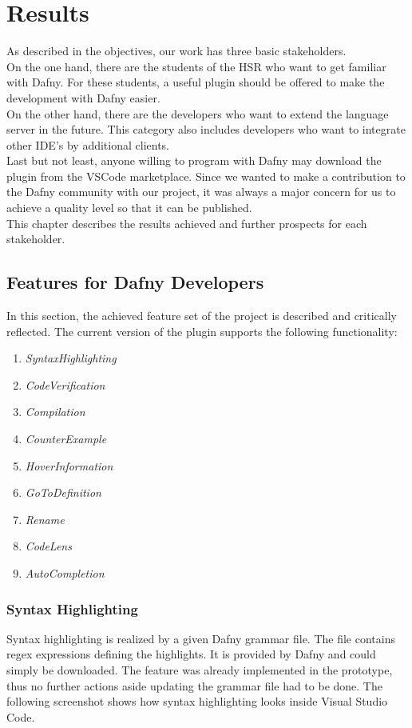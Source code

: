 \section{Results}
\label{section:results}
As described in the objectives, our work has three basic stakeholders. \\

On the one hand, there are the students of the HSR who want to get familiar with Dafny.
For these students, a useful plugin should be offered to make the development with Dafny easier. \\

On the other hand, there are the developers who want to extend the language server in the future.
This category also includes developers who want to integrate other IDE's by additional clients.\\

Last but not least, anyone willing to program with Dafny may download the plugin from the VSCode marketplace.
Since we wanted to make a contribution to the Dafny community with our project,
it was always a major concern for us to achieve a quality level so that it can be published.\\

This chapter describes the results achieved and further prospects for each stakeholder.

\subsection{Features for Dafny Developers}
In this section, the achieved feature set of the project is described and critically reflected.
The current version of the plugin supports the following functionality:
\begin{enumerate}
    \item \textit{SyntaxHighlighting}
    \item \textit{CodeVerification}
    \item \textit{Compilation}
    \item \textit{CounterExample}
    \item \textit{HoverInformation}
    \item \textit{GoToDefinition}
    \item \textit{Rename}
    \item \textit{CodeLens}
    \item \textit{AutoCompletion}
\end{enumerate}

\subsubsection{Syntax Highlighting}
\label{section:result:syntaxhighgliht}
Syntax highlighting is realized by a given Dafny grammar file.
The file contains regex expressions defining the highlights.
It is provided by Dafny \cite{syntax_update} and could simply be downloaded.
The feature was already implemented in the prototype, thus no further actions aside updating the grammar file had to be done.
The following screenshot shows how syntax highlighting looks inside Visual Studio Code.

